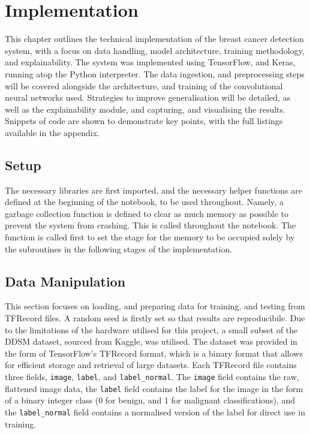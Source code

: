 \documentclass[../main]{subfiles}
\begin{document}
\chapter{Implementation}
This chapter outlines the technical implementation of the breast cancer
detection system, with a focus on data handling, model architecture, training
methodology, and explainability. The system was implemented using TensorFlow,
and Keras, running atop the Python interpreter. The data ingestion, and
preprocessing steps will be covered alongside the architecture, and training of
the convolutional neural networks used. Strategies to improve generalisation
will be detailed, as well as the explainability module, and capturing, and
visualising the results. Snippets of code are shown to demonstrate key points,
with the full listings available in the appendix.

\section{Setup}
The necessary libraries are first imported, and the necessary helper functions
are defined at the beginning of the notebook, to be used throughout. Namely, a
garbage collection function is defined to clear as much memory as possible to
prevent the system from crashing. This is called throughout the notebook. The
function is called first to set the stage for the memory to be occupied solely
by the subroutines in the following stages of the implementation.

\section{Data Manipulation}
This section focuses on loading, and preparing data for training, and testing
from TFRecord files. A random seed is firstly set so that results are
reproducibile. Due to the limitations of the hardware utilised for this
project, a small subset of the DDSM dataset, sourced from Kaggle, was utilised.
The dataset was provided in the form of TensorFlow's TFRecord format, which is
a binary format that allows for efficient storage and retrieval of large
datasets. Each TFRecord file contains three fields, \texttt{image},
\texttt{label}, and \texttt{label\_normal}. The \texttt{image} field contains
the raw, flattened image data, the \texttt{label} field contains the label for
the image in the form of a binary integer class (0 for benign, and 1 for
malignant classifications), and the \texttt{label\_normal} field contains a
normalised version of the label for direct use in training.
\end{document}
